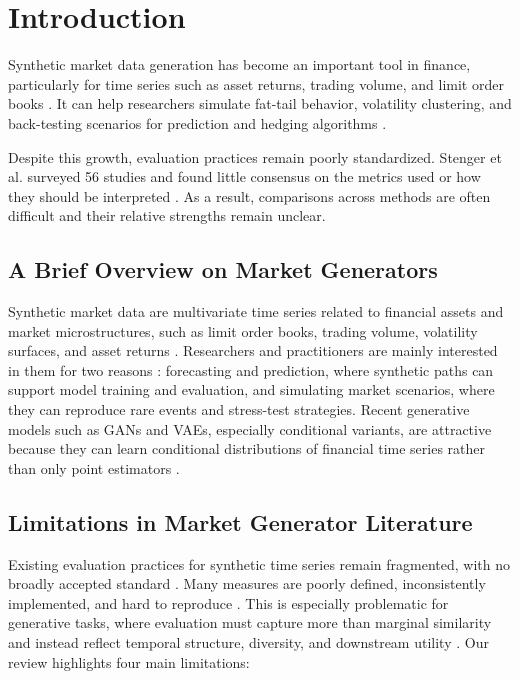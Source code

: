 \section{Introduction}
  Synthetic market data generation has become an important tool in
  finance, particularly for time series such as asset returns, trading
  volume, and limit order books \cite{Potluru24, Horvath2025}. It can
  help researchers simulate fat-tail behavior, volatility clustering,
  and back-testing scenarios for prediction and hedging algorithms
  \cite{Stenger24}.

  Despite this growth, evaluation practices remain poorly
  standardized. Stenger et al. surveyed 56 studies and found little
  consensus on the metrics used or how they should be interpreted
  \cite{Stenger24}. As a result, comparisons across methods are often
  difficult and their relative strengths remain unclear.

  \subsection{A Brief Overview on Market Generators}
    Synthetic market data are multivariate time series related to
    financial assets and market microstructures, such as limit order
    books, trading volume, volatility surfaces, and asset returns
    \cite{Assefa2019, Stenger24, Horvath2025}. Researchers and
    practitioners are mainly interested in them for two reasons
    \cite{Horvath2025}: forecasting and prediction, where synthetic
    paths can support model training and evaluation, and simulating
    market scenarios, where they can reproduce rare events and
    stress-test strategies. Recent generative models such as GANs and
    VAEs, especially conditional variants, are attractive because they
    can learn conditional distributions of financial time series rather
    than only point estimators \cite{Horvath2025}.

  \subsection{Limitations in Market Generator Literature}
    Existing evaluation practices for synthetic time series remain
    fragmented, with no broadly accepted standard \cite{Wang20,
    Stenger24}. Many measures are poorly defined, inconsistently
    implemented, and hard to reproduce \cite{Stenger24}. This is
    especially problematic for generative tasks, where evaluation must
    capture more than marginal similarity and instead reflect temporal
    structure, diversity, and downstream utility \cite{Stenger24,
    Horvath2025}. Our review highlights four main limitations:

